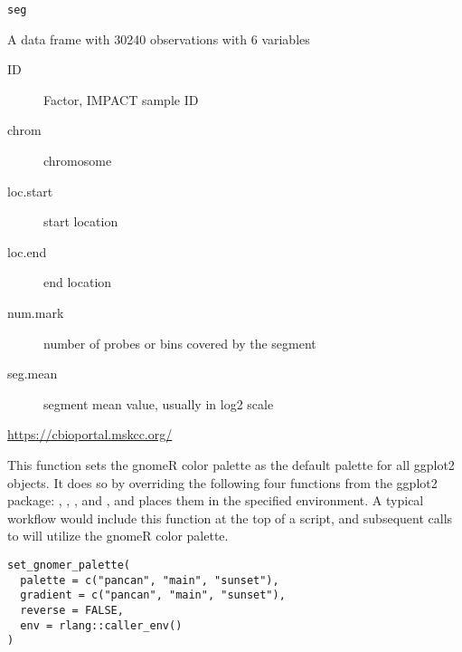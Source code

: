 \documentclass[a4paper]{book}
\begin{document}
%
\begin{Usage}
\begin{verbatim}
seg
\end{verbatim}
\end{Usage}
%
\begin{Format}
A data frame with 30240 observations with 6 variables
\begin{description}

\item[ID] Factor, IMPACT sample ID
\item[chrom] chromosome
\item[loc.start] start location
\item[loc.end] end location
\item[num.mark] number of probes or bins covered by the segment
\item[seg.mean] segment mean value, usually in log2 scale

\end{description}

\end{Format}
%
\begin{Source}\relax
\url{https://cbioportal.mskcc.org/}
\end{Source}
%
\begin{Description}\relax
This function sets the gnomeR color palette as the default palette for all
ggplot2 objects. It does so by overriding the following four functions from
the ggplot2 package: ,
, , and
, and places them in the specified environment.
A typical workflow would include this function at the top of a script,
and subsequent calls to  will utilize the gnomeR color palette.
\end{Description}
%
\begin{Usage}
\begin{verbatim}
set_gnomer_palette(
  palette = c("pancan", "main", "sunset"),
  gradient = c("pancan", "main", "sunset"),
  reverse = FALSE,
  env = rlang::caller_env()
)
\end{verbatim}
\end{Usage}
%
\end{document}
